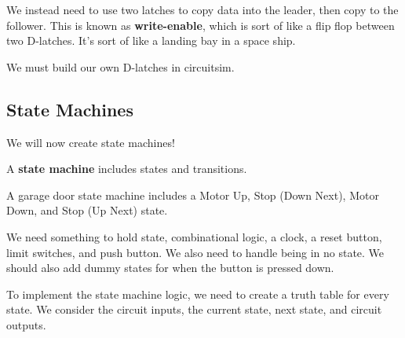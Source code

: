 
We instead need to use two latches to copy data into the leader, then copy to the follower. This is known as \textbf{write-enable}, which is sort of like a flip flop between two D-latches. It's sort of like a landing bay in a space ship.

\begin{note}
	We must build our own D-latches in circuitsim.
\end{note}

\subsection{State Machines}

We will now create state machines!

\begin{definition}
	A \textbf{state machine} includes states and transitions.
\end{definition}

\begin{eg}
	A garage door state machine includes a Motor Up, Stop (Down Next), Motor Down, and Stop (Up Next) state.
\end{eg}

We need something to hold state, combinational logic, a clock, a reset button, limit switches, and push button. We also need to handle being in no state. We should also add dummy states for when the button is pressed down.

To implement the state machine logic, we need to create a truth table for every state. We consider the circuit inputs, the current state, next state, and circuit outputs.
